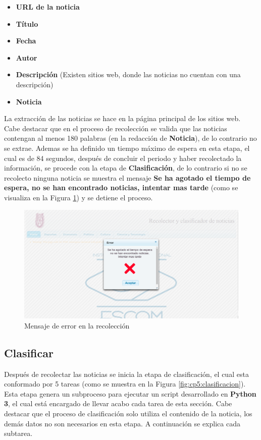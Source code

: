 \begin{itemize}
	\item \textbf{URL de la noticia}
	\item \textbf{Título}
	\item \textbf{Fecha}
	\item \textbf{Autor}
	\item \textbf{Descripción} (Existen sitios web, donde las noticias no cuentan con una descripción)
	\item \textbf{Noticia}
\end{itemize}

La extracción de las noticias se hace en la página principal de los sitios web. Cabe destacar que en el proceso de recolección se valida que las noticias contengan al menos 180 palabras (en la redacción de \textbf{Noticia}), de lo contrario no se extrae. Ademas se ha definido un tiempo máximo de espera en esta etapa, el cual es de 84 segundos, después de concluir el periodo y haber recolectado la información, se procede con la etapa de \textbf{Clasificación}, de lo contrario si no se recolecto ninguna noticia se muestra el mensaje \textbf{Se ha agotado el tiempo de espera, no se han encontrado noticias, intentar mas tarde} (como se visualiza en la Figura \ref{fig:notNoRec}) y se detiene el proceso.

\begin{figure}[H]
\centering
\includegraphics[scale=0.29]{imagenes/Capitulo5/errorConectividad.png}
\caption{Mensaje de error en la recolección}
\label{fig:notNoRec}
\end{figure}

\subsection{Clasificar}

Después de recolectar las noticias se inicia la etapa de clasificación, el cual esta conformado por 5 tareas (como se muestra en la Figura \ref{fig:cp5:clasificacion}). Esta etapa genera un subproceso para ejecutar un script desarrollado en \textbf{Python 3}, el cual está encargado de llevar acabo cada tarea de esta sección. Cabe destacar que el proceso de clasificación solo utiliza el contenido de la noticia, los demás datos no son necesarios en esta etapa. A continuación se explica cada subtarea.

